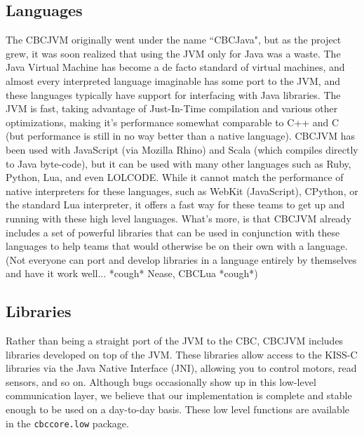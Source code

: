 \documentclass[10pt,letterpaper]{article}
\begin{document}
\subsection{Languages}

The CBCJVM originally went under the name ``CBCJava", but as the project grew, it was soon realized that using the JVM only for Java was a waste. The Java Virtual Machine has become a de facto standard of virtual machines, and almost every interpreted language imaginable has some port to the JVM, and these languages typically have support for interfacing with Java libraries. The JVM is fast, taking advantage of Just-In-Time compilation and various other optimizations, making it's performance somewhat comparable to C++ and C (but performance is still in no way better than a native language). CBCJVM has been used with JavaScript (via Mozilla Rhino) and Scala (which compiles directly to Java byte-code), but it can be used with many other languages such as Ruby, Python, Lua, and even LOLCODE. While it cannot match the performance of native interpreters for these languages, such as WebKit (JavaScript), CPython, or the standard Lua interpreter, it offers a fast way for these teams to get up and running with these high level languages. What's more, is that CBCJVM already includes a set of powerful libraries that can be used in conjunction with these languages to help teams that would otherwise be on their own with a language. (Not everyone can port and develop libraries in a language entirely by themselves and have it work well... *cough* Nease, CBCLua *cough*)



\subsection{Libraries}

Rather than being a straight port of the JVM to the CBC, CBCJVM includes libraries developed on top of the JVM. These libraries allow access to the KISS-C libraries via the Java Native Interface (JNI), allowing you to control motors, read sensors, and so on. Although bugs occasionally show up in this low-level communication layer, we believe that our implementation is complete and stable enough to be used on a day-to-day basis. These low level functions are available in the \texttt{cbccore.low} package.
\end{document}

